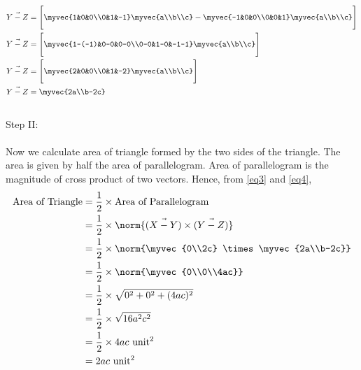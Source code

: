 \documentclass[journal,12pt]{IEEEtran}
\begin{document}
\begin{align}
\vec{Y-Z} & = \Bigg[\myvec{1&0&0\\0&1&-1}\myvec{a\\b\\c} - \myvec{-1&0&0\\0&0&1}\myvec{a\\b\\c}\Bigg] \\
\vec{Y-Z} & = \Bigg[\myvec{1-(-1)&0-0&0-0\\0-0&1-0&-1-1}\myvec{a\\b\\c}\Bigg] \\
\vec{Y-Z} & = \Bigg[\myvec{2&0&0\\0&1&-2}\myvec{a\\b\\c}\Bigg] \\
\vec{Y-Z} & = \myvec{2a\\b-2c}
\label{eq4}
\end{align}\\
Step II:\\\\
Now we calculate area of triangle formed by the two sides of the triangle. The area is given by half the area of parallelogram. Area of parallelogram is the magnitude of cross product of two vectors. Hence, from \ref{eq3} and \ref{eq4},\\
\begin{align}
\text{Area of Triangle} & = \frac{1}{2} \times \text{Area of Parallelogram} \\
& = \frac{1}{2} \times \norm{\Vec{(X-Y)}\times\Vec{(Y-Z)}} \\
& = \frac{1}{2} \times \norm{\myvec{0\\2c} \times \myvec{2a\\b-2c}} \\
& = \frac{1}{2} \times \norm{\myvec{0\\0\\4ac}} \\
& = \frac{1}{2} \times \sqrt{0^2 + 0^2+ (4ac)^2} \\
& = \frac{1}{2} \times \sqrt{16a^2c^2} \\
& = \frac{1}{2} \times  4ac \text{ unit}^2 \\
& = 2ac \text{ unit}^2
\label{eq5}
\end{align}\\
\end{document}
